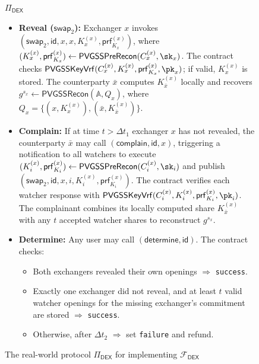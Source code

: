 \documentclass[runningheads]{llncs}
\newcommand{\dex}{\mathcal{F}_{\mathsf{DEX}}}
\newcommand{\swapid}{\mathsf{id}}
\newcommand{\pvgssPreRecon}{\mathsf{PVGSSPreRecon}}
\newcommand{\pvgssKeyVrf}{\mathsf{PVGSSKeyVrf}}
\newcommand{\pvgssRecon}{\mathsf{PVGSSRecon}}
\newcommand{\proofs}{\mathsf{prf}}
\begin{document}
\begin{figure}[!h]
\begin{functionality3}{$\Pi_{\mathsf{DEX}}$}
\begin{itemize}
    \item \textbf{Reveal (\(\mathsf{swap}_2\)):} Exchanger $x$ invokes $(\mathsf{swap}_2, \swapid, x, x, K_x^{(x)}, \proofs_{K_x}^{(x)})$, where $(K_x^{(x)}, \proofs_{K_x}^{(x)}) \gets \pvgssPreRecon(C_x^{(x)}, \sk_x)$. The contract checks $\pvgssKeyVrf(C_x^{(x)}, K_x^{(x)}, \proofs_{K_x}^{(x)}, \pk_x)$; if valid, $K_x^{(x)}$ is stored. The counterparty $\bar{x}$ computes $K_{\bar{x}}^{(x)}$ locally and recovers $g^{s_x} \gets \pvgssRecon(\mathbb{A},Q_x)$, where $Q_x=\{(x,K_x^{(x)}),(\bar{x},K_{\bar{x}}^{(x)})\}$.

    \item \textbf{Complain:} If at time $t > \Delta t_1$ exchanger $x$ has not revealed, the counterparty $\bar{x}$ may call $(\mathsf{complain}, \swapid, x)$, triggering a notification to all watchers to execute $(K_i^{(x)}, \proofs_{K_i}^{(x)}) \gets \pvgssPreRecon(C_i^{(x)}, \sk_i)$ and publish $(\mathsf{swap}_2, \swapid, x, i, K_i^{(x)}, \proofs_{K_i}^{(x)})$. The contract verifies each watcher response with $\pvgssKeyVrf(C_i^{(x)},K_i^{(x)},\proofs_{K_i}^{(x)},\pk_i)$. The complainant combines its locally computed share $K_{\bar{x}}^{(x)}$ with any $t$ accepted watcher shares to reconstruct $g^{s_x}$.

    \item \textbf{Determine:} Any user may call $(\mathsf{determine}, \swapid)$. The contract checks:
    \begin{itemize}
        \item Both exchangers revealed their own openings $\Rightarrow$ \texttt{success}.
        \item Exactly one exchanger did not reveal, and at least $t$ valid watcher openings for the missing exchanger's commitment are stored $\Rightarrow$ \texttt{success}.
        \item Otherwise, after $\Delta t_2$ $\Rightarrow$ set \texttt{failure} and refund.
    \end{itemize}
\end{itemize}


\end{functionality3}
\caption{The real-world protocol $\Pi_{\mathsf{DEX}}$ for implementing $\dex$}
\label{fig:pvgss_dex}
\end{figure}
\end{document}
